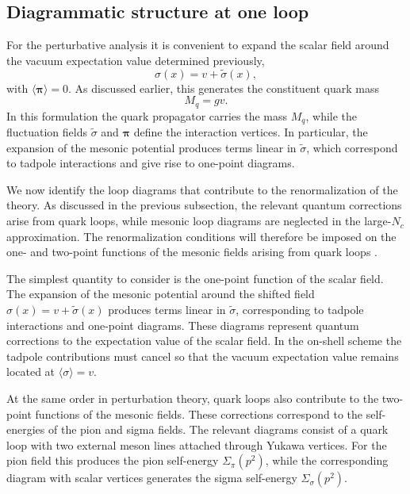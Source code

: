 \subsection*{Diagrammatic structure at one loop}

For the perturbative analysis it is convenient to expand the scalar
field around the vacuum expectation value determined previously,
\begin{equation}
\sigma(x) = v + \tilde{\sigma}(x),
\label{eq:sigma_shift}
\end{equation}
with $\langle \boldsymbol{\pi} \rangle = 0$. As discussed earlier,
this generates the constituent quark mass
\begin{equation}
M_q = g v .
\end{equation}
In this formulation the quark propagator carries the mass $M_q$, while
the fluctuation fields $\tilde{\sigma}$ and $\boldsymbol{\pi}$ define
the interaction vertices. In particular, the expansion of the mesonic
potential produces terms linear in $\tilde{\sigma}$, which correspond
to tadpole interactions and give rise to one-point diagrams.

We now identify the loop diagrams that contribute to the
renormalization of the theory.
As discussed in the previous subsection, the relevant quantum
corrections arise from quark loops, while mesonic loop diagrams are
neglected in the large-$N_c$ approximation. The renormalization
conditions will therefore be imposed on the one- and two-point
functions of the mesonic fields arising from quark loops
\cite{PeskinSchroeder1995,Folkestad2018}.

The simplest quantity to consider is the one-point function of the
scalar field. The expansion of the mesonic potential around the
shifted field $\sigma(x)=v+\tilde{\sigma}(x)$ produces terms linear
in $\tilde{\sigma}$, corresponding to tadpole interactions and
one-point diagrams. These diagrams represent quantum corrections to
the expectation value of the scalar field. In the on-shell scheme the
tadpole contributions must cancel so that the vacuum expectation
value remains located at $\langle\sigma\rangle = v$.

At the same order in perturbation theory, quark loops also contribute
to the two-point functions of the mesonic fields. These corrections
correspond to the self-energies of the pion and sigma fields.
The relevant diagrams consist of a quark loop with two
external meson lines attached through Yukawa vertices. For the pion
field this produces the pion self-energy $\Sigma_\pi(p^2)$, while the
corresponding diagram with scalar vertices generates the sigma
self-energy $\Sigma_\sigma(p^2)$.


